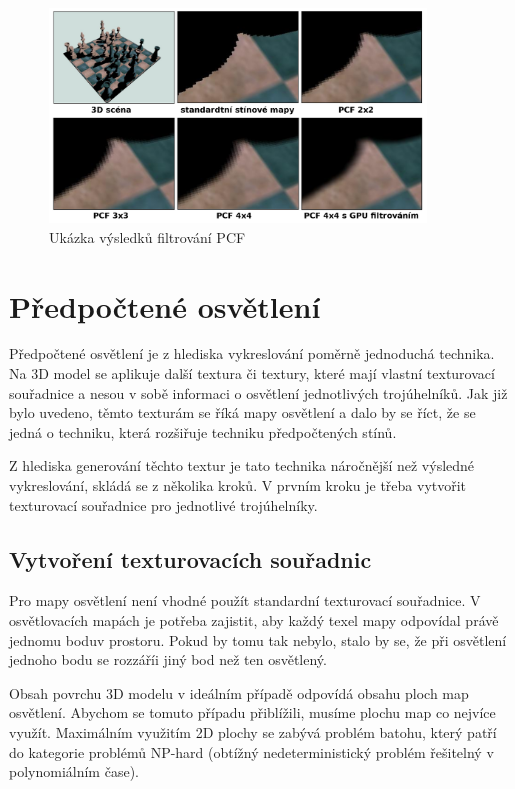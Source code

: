 \documentclass[11pt,twoside,a4paper]{book}
\begin{document}
\begin{center}
\begin{figure}[h]
\includegraphics[width=100mm]{figures/pcf-example.png}
\caption{Ukázka výsledků filtrování PCF}
\end{figure}
\end{center}
\newpage

\section{Předpočtené osvětlení}
Předpočtené osvětlení je z hlediska vykreslování poměrně jednoduchá technika. Na 3D model se aplikuje další textura či textury, které mají vlastní texturovací souřadnice a nesou v sobě informaci o osvětlení jednotlivých trojúhelníků. Jak již bylo uvedeno, těmto texturám se říká mapy osvětlení a dalo by se říct, že se jedná o techniku, která rozšiřuje techniku předpočtených stínů.

Z hlediska generování těchto textur je tato technika náročnější než výsledné vykreslování, skládá se z několika kroků. V prvním kroku je třeba vytvořit texturovací souřadnice pro jednotlivé trojúhelníky.

\subsection{Vytvoření texturovacích souřadnic}
Pro mapy osvětlení není vhodné použít standardní texturovací souřadnice. V osvětlovacích mapách je potřeba zajistit, aby každý texel mapy odpovídal právě jednomu bodu\linebreak v prostoru. Pokud by tomu tak nebylo, stalo by se, že při osvětlení jednoho bodu se rozzáří\linebreak i jiný bod než ten osvětlený.

Obsah povrchu 3D modelu v ideálním případě odpovídá obsahu ploch map osvětlení. Abychom se tomuto případu přiblížili, musíme plochu map co nejvíce využít. Maximálním využitím 2D plochy se zabývá problém batohu, který patří do kategorie problémů NP-hard (obtížný nedeterministický problém řešitelný v polynomiálním čase).
\end{document}
